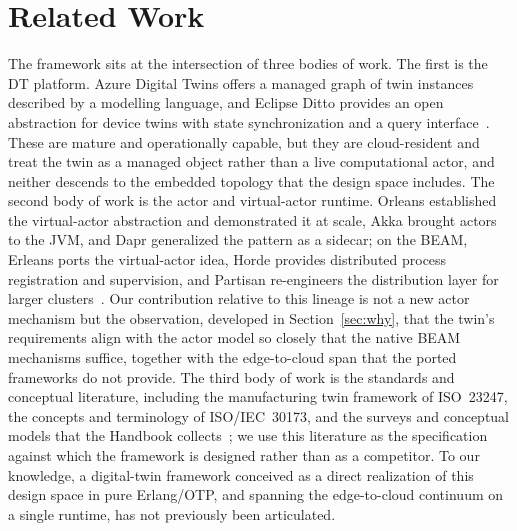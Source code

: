 \documentclass[conference]{IEEEtran}
\newcommand{\beam}{BEAM\xspace}
\newcommand{\otp}{OTP\xspace}
\newcommand{\dt}{DT\xspace}
\begin{document}
\section{Related Work}
\label{sec:related}
The framework sits at the intersection of three bodies of work. The first is the
\dt platform. Azure Digital Twins offers a managed graph of twin instances
described by a modelling language, and Eclipse Ditto provides an open
abstraction for device twins with state synchronization and a query
interface~\cite{azuredt,ditto}. These are mature and operationally capable, but
they are cloud-resident and treat the twin as a managed object rather than a
live computational actor, and neither descends to the embedded topology that the
design space includes. The second body of work is the actor and virtual-actor
runtime. Orleans established the virtual-actor abstraction and demonstrated it at
scale, Akka brought actors to the JVM, and Dapr generalized the pattern as a
sidecar; on the \beam, Erleans ports the virtual-actor idea, Horde provides
distributed process registration and supervision, and Partisan re-engineers the
distribution layer for larger clusters~\cite{orleans,erleans,horde,partisan}.
Our contribution relative to this lineage is not a new actor mechanism but the
observation, developed in Section~\ref{sec:why}, that the twin's requirements
align with the actor model so closely that the native \beam mechanisms suffice,
together with the edge-to-cloud span that the ported frameworks do not provide.
The third body of work is the standards and conceptual literature, including the
manufacturing twin framework of ISO~23247, the concepts and terminology of
ISO/IEC~30173, and the surveys and conceptual models that the Handbook
collects~\cite{iso23247,iso30173,handbook,fuller2020,minerva2020}; we use this
literature as the specification against which the framework is designed rather
than as a competitor. To our knowledge, a digital-twin framework conceived as a
direct realization of this design space in pure Erlang/\otp, and spanning the
edge-to-cloud continuum on a single runtime, has not previously been articulated.
\end{document}
